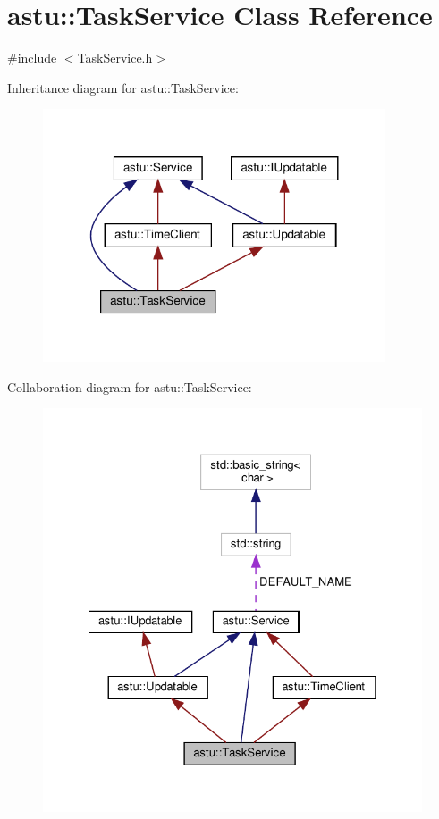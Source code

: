 \hypertarget{classastu_1_1TaskService}{}\section{astu\+:\+:Task\+Service Class Reference}
\label{classastu_1_1TaskService}


{\ttfamily \#include $<$Task\+Service.\+h$>$}



Inheritance diagram for astu\+:\+:Task\+Service\+:\nopagebreak
\begin{figure}[H]
\begin{center}
\leavevmode
\includegraphics[width=287pt]{classastu_1_1TaskService__inherit__graph}
\end{center}
\end{figure}


Collaboration diagram for astu\+:\+:Task\+Service\+:\nopagebreak
\begin{figure}[H]
\begin{center}
\leavevmode
\includegraphics[width=328pt]{classastu_1_1TaskService__coll__graph}
\end{center}
\end{figure}
